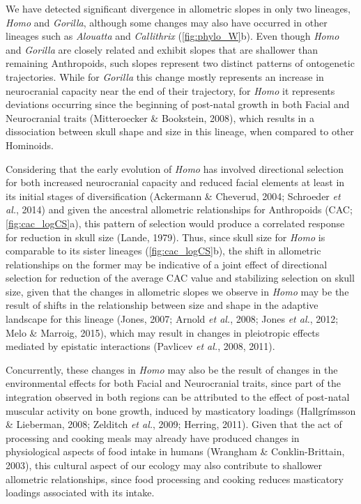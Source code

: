 \documentclass[12pt,twoside]{report}
\begin{document}
We have detected significant divergence in allometric slopes in only two
lineages, \emph{Homo} and \emph{Gorilla}, although some changes may also
have occurred in other lineages such as \emph{Alouatta} and
\emph{Callithrix} (\autoref{fig:phylo_W}b). Even though \emph{Homo} and
\emph{Gorilla} are closely related and exhibit slopes that are shallower
than remaining Anthropoids, such slopes represent two distinct patterns
of ontogenetic trajectories. While for \emph{Gorilla} this change mostly
represents an increase in neurocranial capacity near the end of their
trajectory, for \emph{Homo} it represents deviations occurring since the
beginning of post-natal growth in both Facial and Neurocranial traits
(Mitteroecker \& Bookstein, 2008), which results in a dissociation
between skull shape and size in this lineage, when compared to other
Hominoids.

Considering that the early evolution of \emph{Homo} has involved
directional selection for both increased neurocranial capacity and
reduced facial elements at least in its initial stages of
diversification (Ackermann \& Cheverud, 2004; Schroeder \emph{et al.},
2014) and given the ancestral allometric relationships for Anthropoids
(CAC; \autoref{fig:cac_logCS}a), this pattern of selection would produce
a correlated response for reduction in skull size (Lande, 1979). Thus,
since skull size for \emph{Homo} is comparable to its sister lineages
(\autoref{fig:cac_logCS}b), the shift in allometric relationships on the
former may be indicative of a joint effect of directional selection for
reduction of the average CAC value and stabilizing selection on skull
size, given that the changes in allometric slopes we observe in
\emph{Homo} may be the result of shifts in the relationship between size
and shape in the adaptive landscape for this lineage (Jones, 2007;
Arnold \emph{et al.}, 2008; Jones \emph{et al.}, 2012; Melo \& Marroig,
2015), which may result in changes in pleiotropic effects mediated by
epistatic interactions (Pavlicev \emph{et al.}, 2008, 2011).

Concurrently, these changes in \emph{Homo} may also be the result of
changes in the environmental effects for both Facial and Neurocranial
traits, since part of the integration observed in both regions can be
attributed to the effect of post-natal muscular activity on bone growth,
induced by masticatory loadings (Hallgrímsson \& Lieberman, 2008;
Zelditch \emph{et al.}, 2009; Herring, 2011). Given that the act of
processing and cooking meals may already have produced changes in
physiological aspects of food intake in humans (Wrangham \&
Conklin-Brittain, 2003), this cultural aspect of our ecology may also
contribute to shallower allometric relationships, since food processing
and cooking reduces masticatory loadings associated with its intake.
\end{document}

